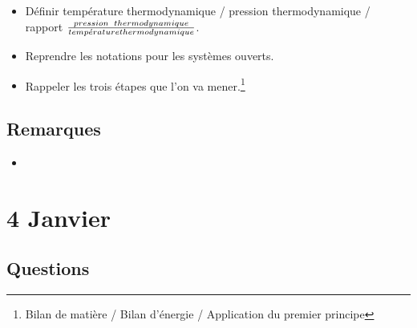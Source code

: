 \documentclass[a4paper, 11pt, hidelinks]{article}
\begin{document}
\begin{itemize}
    \item Définir température thermodynamique / pression thermodynamique / rapport $\frac{pression \\ thermodynamique}{temp\acute{e}rature \\ thermodynamique}$. \cite{Chapitre19}
    \item Reprendre les notations pour les systèmes ouverts. \cite{Chapitre19}
    \item Rappeler les trois étapes que l'on va mener.\footnote{Bilan de matière / Bilan d'énergie / Application du premier principe}
\end{itemize}




\subsection{Remarques}



\begin{itemize}
    \item 
\end{itemize}






\section{4 Janvier}

\subsection{Questions}
\end{document}
